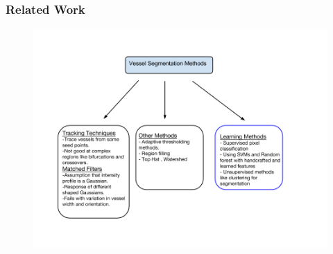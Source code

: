 \documentclass{beamer}
\begin{document}
			\begin{frame}
				\frametitle{Related Work}
				\begin{figure}
					\includegraphics[width=0.9\linewidth]{methods/m3.png}%
				\end{figure}
			\end{frame}
%			
\end{document}
